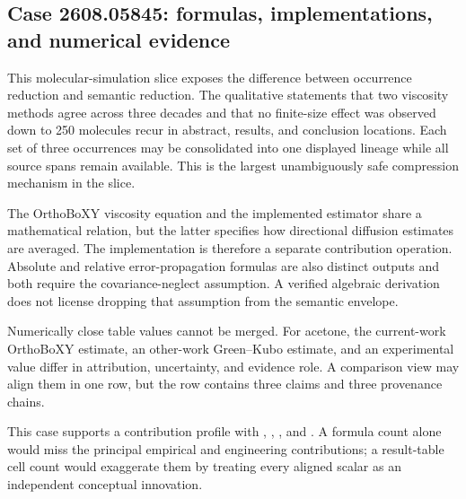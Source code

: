 \subsection{Case 2608.05845: formulas, implementations, and numerical evidence}\label{case:contrib-05845}

This molecular-simulation slice exposes the difference between occurrence reduction and semantic reduction. The qualitative statements that two viscosity methods agree across three decades and that no finite-size effect was observed down to 250 molecules recur in abstract, results, and conclusion locations. Each set of three occurrences may be consolidated into one displayed lineage while all source spans remain available. This is the largest unambiguously safe compression mechanism in the slice.

The OrthoBoXY viscosity equation and the implemented estimator share a mathematical relation, but the latter specifies how directional diffusion estimates are averaged. The implementation is therefore a separate contribution operation. Absolute and relative error-propagation formulas are also distinct outputs and both require the covariance-neglect assumption. A verified algebraic derivation does not license dropping that assumption from the semantic envelope.

Numerically close table values cannot be merged. For acetone, the current-work OrthoBoXY estimate, an other-work Green--Kubo estimate, and an experimental value differ in attribution, uncertainty, and evidence role. A comparison view may align them in one row, but the row contains three claims and three provenance chains.

This case supports a contribution profile with , , , and . A formula count alone would miss the principal empirical and engineering contributions; a result-table cell count would exaggerate them by treating every aligned scalar as an independent conceptual innovation.